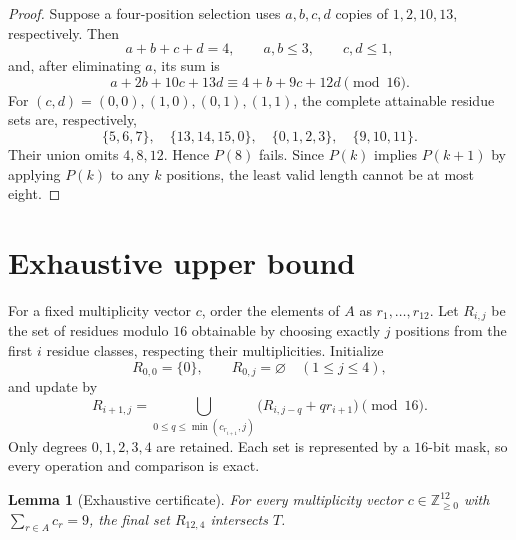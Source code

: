 \documentclass[11pt]{article}
\newtheorem{lemma}[theorem]{Lemma}
\newcommand{\Z}{\mathbb Z}
\begin{document}
\begin{proof}
Suppose a four-position selection uses $a,b,c,d$ copies of
$1,2,10,13$, respectively.  Then
\[
 a+b+c+d=4,\qquad a,b\leq3,\qquad c,d\leq1,
\]
and, after eliminating $a$, its sum is
\[
 a+2b+10c+13d\equiv4+b+9c+12d\pmod {16}.
\]
For $(c,d)=(0,0),(1,0),(0,1),(1,1)$, the complete attainable residue
sets are, respectively,
\[
 \{5,6,7\},\quad
 \{13,14,15,0\},\quad
 \{0,1,2,3\},\quad
 \{9,10,11\}.
\]
Their union omits $4,8,12$.  Hence $P(8)$ fails.  Since $P(k)$ implies
$P(k+1)$ by applying $P(k)$ to any $k$ positions, the least valid length
cannot be at most eight.
\end{proof}

\section{Exhaustive upper bound}

For a fixed multiplicity vector $c$, order the elements of $A$ as
$r_1,\ldots,r_{12}$.  Let $R_{i,j}$ be the set of residues modulo $16$
obtainable by choosing exactly $j$ positions from the first $i$ residue
classes, respecting their multiplicities.  Initialize
\[
 R_{0,0}=\{0\},\qquad R_{0,j}=\varnothing\quad(1\leq j\leq4),
\]
and update by
\begin{equation}\label{eq:dp}
 R_{i+1,j}=
 \bigcup_{0\leq q\leq\min(c_{r_{i+1}},j)}
 \bigl(R_{i,j-q}+q r_{i+1}\bigr)\pmod {16}.
\end{equation}
Only degrees $0,1,2,3,4$ are retained.  Each set is represented by a
$16$-bit mask, so every operation and comparison is exact.

\begin{lemma}[Exhaustive certificate]\label{lem:certificate}
For every multiplicity vector $c\in\Z_{\geq0}^{12}$ with
$\sum_{r\in A}c_r=9$, the final set $R_{12,4}$ intersects $T$.
\end{lemma}
\end{document}
